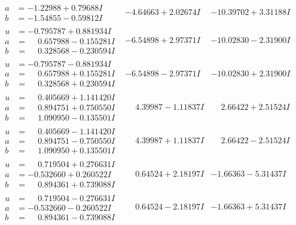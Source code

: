\documentclass[1p]{elsarticle_modified}
\theoremstyle{definition}
\begin{document}
$$\begin{array}{c|c|c}
\begin{aligned}
a &= -1.22988 + 0.79688 I \\
b &= -1.54855 - 0.59812 I\end{aligned}
 & -4.64663 + 2.02674 I & -10.39702 + 3.31188 I \\ \hline\begin{aligned}
u &= -0.795787 + 0.881934 I \\
a &= \phantom{-}0.657988 - 0.155281 I \\
b &= \phantom{-}0.328568 - 0.230594 I\end{aligned}
 & -6.54898 + 2.97371 I & -10.02830 - 2.31900 I \\ \hline\begin{aligned}
u &= -0.795787 - 0.881934 I \\
a &= \phantom{-}0.657988 + 0.155281 I \\
b &= \phantom{-}0.328568 + 0.230594 I\end{aligned}
 & -6.54898 - 2.97371 I & -10.02830 + 2.31900 I \\ \hline\begin{aligned}
u &= \phantom{-}0.405669 + 1.141420 I \\
a &= \phantom{-}0.894751 + 0.750550 I \\
b &= \phantom{-}1.090950 - 0.135501 I\end{aligned}
 & \phantom{-}4.39987 - 1.11837 I & \phantom{-}2.66422 + 2.51524 I \\ \hline\begin{aligned}
u &= \phantom{-}0.405669 - 1.141420 I \\
a &= \phantom{-}0.894751 - 0.750550 I \\
b &= \phantom{-}1.090950 + 0.135501 I\end{aligned}
 & \phantom{-}4.39987 + 1.11837 I & \phantom{-}2.66422 - 2.51524 I \\ \hline\begin{aligned}
u &= \phantom{-}0.719504 + 0.276631 I \\
a &= -0.532660 + 0.260522 I \\
b &= \phantom{-}0.894361 + 0.739088 I\end{aligned}
 & \phantom{-}0.64524 + 2.18197 I & -1.66363 - 5.31437 I \\ \hline\begin{aligned}
u &= \phantom{-}0.719504 - 0.276631 I \\
a &= -0.532660 - 0.260522 I \\
b &= \phantom{-}0.894361 - 0.739088 I\end{aligned}
 & \phantom{-}0.64524 - 2.18197 I & -1.66363 + 5.31437 I \\ \hline\begin{aligned}

\end{aligned}
\end{array}$$
\end{document}

